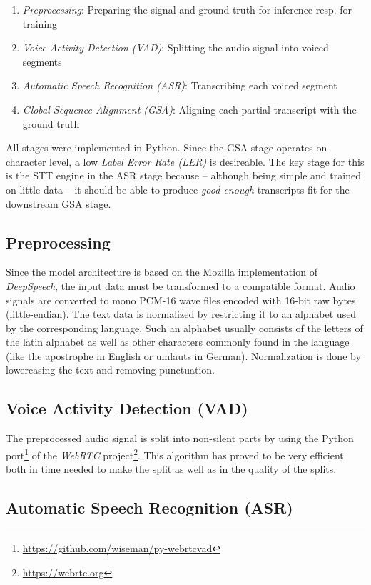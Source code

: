 \documentclass[letterpaper]{article}
\begin{document}
\begin{enumerate}
	\item \textit{Preprocessing}: Preparing the signal and ground truth for inference resp. for training
	\item \textit{Voice Activity Detection (VAD)}: Splitting the audio signal into voiced segments
	\item \textit{Automatic Speech Recognition (ASR)}: Transcribing each voiced segment
	\item \textit{Global Sequence Alignment (GSA)}: Aligning each partial transcript with the ground truth
\end{enumerate}

All stages were implemented in Python. Since the GSA stage operates on character level, a low \textit{Label Error Rate (LER)} is desireable. The key stage for this is the STT engine in the ASR stage because -- although being simple and trained on little data -- it should be able to produce \textit{good enough} transcripts fit for the downstream GSA stage.

\subsection{Preprocessing}

Since the model architecture is based on the Mozilla implementation of \textit{DeepSpeech}, the input data must be transformed to a compatible format. Audio signals are converted to mono PCM-16 wave files encoded with 16-bit raw bytes (little-endian). The text data is normalized by restricting it to an alphabet used by the corresponding language. Such an alphabet usually consists of the letters of the latin alphabet as well as other characters commonly found in the language (like the apostrophe in English or umlauts in German). Normalization is done by lowercasing the text and removing punctuation.

\subsection{Voice Activity Detection (VAD)}

The preprocessed audio signal is split into non-silent parts by using the Python port\footnote{\url{https://github.com/wiseman/py-webrtcvad}} of the \textit{WebRTC} project\footnote{\url{https://webrtc.org}}. This algorithm has proved to be very efficient both in time needed to make the split as well as in the quality of the splits.

\subsection{Automatic Speech Recognition (ASR)}
\end{document}
